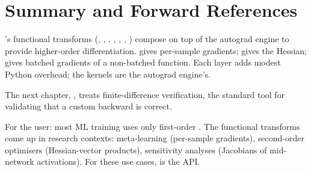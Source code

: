 \section{Summary and Forward References}
\label{sec:higher_order:summary}

\Lucid's functional transforms (, ,
, , , ,
) compose on top of the autograd engine to provide
higher-order differentiation.  gives per-sample
gradients;  gives the Hessian;
 gives batched gradients of a non-batched
function. Each layer adds modest Python overhead; the kernels are
the autograd engine's.

The next chapter, , treats finite-difference
verification, the standard tool for validating that a custom
backward is correct.

\begin{lucidnote}
For the user: most ML training uses only first-order
. The functional transforms come up in research
contexts: meta-learning (per-sample gradients), second-order
optimisers (Hessian-vector products), sensitivity analyses
(Jacobians of mid-network activations). For these use cases,
 is the API.
\end{lucidnote}
